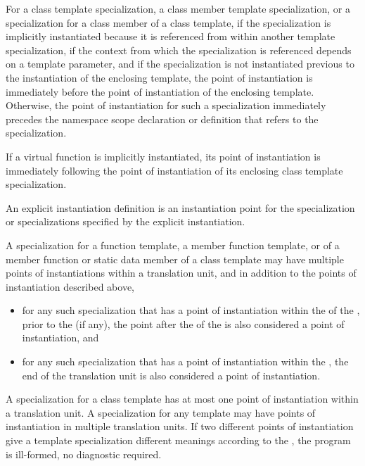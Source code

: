 \pnum
For a class template specialization, a class member template specialization,
or a specialization for a class member of a class template,
if the specialization is implicitly instantiated because it is referenced
from within another template specialization,
if the context from which the specialization is referenced depends on a
template parameter,
and if the specialization is not instantiated previous to the instantiation of
the enclosing template,
the point of instantiation is immediately before the point of instantiation of
the enclosing template.
Otherwise, the point of instantiation for such a specialization immediately
precedes the namespace scope declaration
or definition that refers to the specialization.

\pnum
If a virtual function is implicitly instantiated, its point of instantiation
is immediately following the point of instantiation of its enclosing class
template specialization.

\pnum
An explicit instantiation definition is an instantiation
point for the specialization or specializations specified by the explicit
instantiation.

\pnum
A specialization for a function template, a member function template,
or of a member function or static data member of a class template may have
multiple points of instantiations within a translation unit, and in addition
to the points of instantiation described above,
\begin{itemize}
\item
for any such
specialization that has a point of instantiation within the
 of the
,
prior to the  (if any),
the point after the 
of the 
is also considered a point of instantiation,
and
\item
for any such specialization that has a point of instantiation
within the ,
the end of the translation unit is also
considered a point of instantiation.
\end{itemize}
A specialization for a class template has at most one point of instantiation
within a translation unit.
A specialization for any template may have points of instantiation in multiple
translation units.
If two different points of instantiation give a template specialization
different meanings according to the ,
the program is ill-formed, no diagnostic required.

